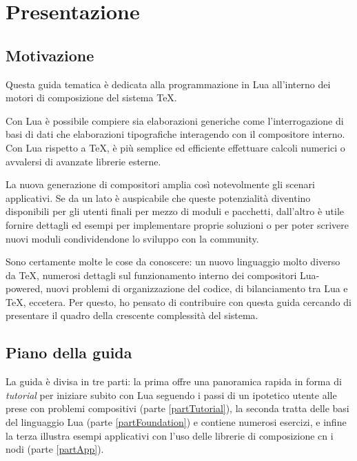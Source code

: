 

\chapter{Presentazione}

\section{Motivazione}

Questa guida tematica è dedicata alla programmazione in Lua all'interno dei
motori di composizione del sistema \TeX.

Con Lua è possibile compiere sia elaborazioni generiche come l'interrogazione di
basi di dati che elaborazioni tipografiche interagendo con il compositore
interno. Con Lua rispetto a \TeX, è più semplice ed efficiente effettuare
calcoli numerici o avvalersi di avanzate librerie esterne.

La nuova generazione di compositori amplia così notevolmente gli scenari
applicativi. Se da un lato è auspicabile che queste potenzialità diventino
disponibili per gli utenti finali per mezzo di moduli e pacchetti, dall'altro è
utile fornire dettagli ed esempi per implementare proprie soluzioni o per poter
scrivere nuovi moduli condividendone lo sviluppo con la community.

Sono certamente molte le cose da conoscere: un nuovo linguaggio molto diverso da
\TeX{}, numerosi dettagli sul funzionamento interno dei compositori Lua-powered,
nuovi problemi di organizzazione del codice, di bilanciamento tra Lua e \TeX,
eccetera. Per questo, ho pensato di contribuire con questa guida cercando di
presentare il quadro della crescente complessità del sistema.


\section{Piano della guida}

La guida è divisa in tre parti: la prima offre una panoramica rapida in forma di
\emph{tutorial} per iniziare subito con Lua seguendo i passi di un ipotetico
utente alle prese con problemi compositivi (parte \ref{partTutorial}), la
seconda tratta delle basi del linguaggio Lua (parte \ref{partFoundation}) e
contiene numerosi esercizi, e infine la terza illustra esempi applicativi con
l'uso delle librerie di composizione cn i nodi (parte \ref{partApp}).

